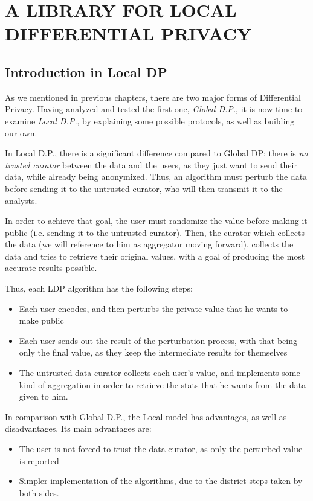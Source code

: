 \chapter{A LIBRARY FOR LOCAL DIFFERENTIAL PRIVACY}

\section{Introduction in Local DP}

As we mentioned in previous chapters, there are two major forms of Differential Privacy. Having analyzed and tested the first one, \emph{Global D.P.}, it is now time to examine \emph{Local D.P.}, by explaining some possible protocols, as well as building our own.


In Local D.P., there is a significant difference compared to Global DP: there is \emph{no trusted curator} between the data and the users, as they just want to send their data, while already being anonymized. Thus, an algorithm must perturb the data before sending it to the untrusted curator, who will then transmit it to the analysts. 

In order to achieve that goal, the user must randomize the value before making it public (i.e. sending it to the untrusted curator). Then, the curator which collects the data (we will reference to him as aggregator moving forward), collects the data and tries to retrieve their original values, with a goal of producing the most accurate results possible. 

Thus, each LDP algorithm has the following steps:

\begin{itemize}
    \item Each user encodes, and then perturbs the private value that he wants to make public
    \item Each user sends out the result of the perturbation process, with that being only the final value, as they keep the intermediate results for themselves
    \item The untrusted data curator collects each user's value, and implements some kind of aggregation in order to retrieve the stats that he wants from the data given to him.
\end{itemize}

In comparison with Global D.P., the Local model has advantages, as well as disadvantages. 
Its main advantages are:
\begin{itemize}
    \item The user is not forced to trust the data curator, as only the perturbed value is reported
    \item Simpler implementation of the algorithms, due to the district steps taken by both sides.
\end{itemize}

